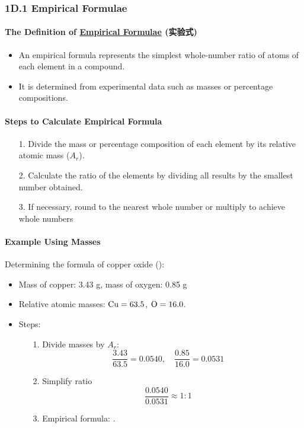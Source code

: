 
\subsubsection{1D.1 Empirical Formulae}
\paragraph{The Definition of \underline{Empirical Formulae} (实验式)}
\begin{itemize}
    \item An empirical formula represents the simplest whole-number ratio of atoms of each element in a compound.
    \item It is determined from experimental data such as masses or percentage compositions.
\end{itemize}

\paragraph{Steps to Calculate Empirical Formula}
\begin{itemize}
    \item[1.] Divide the mass or percentage composition of each element by its relative atomic mass ($A_r$).
    \item[2.] Calculate the ratio of the elements by dividing all results by the smallest number obtained.
    \item[3.] If necessary, round to the nearest whole number or multiply to achieve whole numbers
\end{itemize}

\paragraph{Example Using Masses}
Determining the formula of copper oxide ():
\begin{itemize}
    \item Mass of copper: 3.43 g, mass of oxygen: 0.85 g
    \item Relative atomic masses: $\ce{Cu} = 63.5$, $\ce{O} = 16.0$.
    \item Steps:
    \begin{itemize}
        \item[1.] Divide masses by $A_r$:
        \begin{equation}
            \frac{3.43}{63.5} = 0.0540, \quad \frac{0.85}{16.0} = 0.0531
        \end{equation}
        \item[2.] Simplify ratio
        \begin{equation}
            \frac{0.0540}{0.0531} \approx 1:1
        \end{equation}
        \item[3.] Empirical formula: .
    \end{itemize}
\end{itemize}

